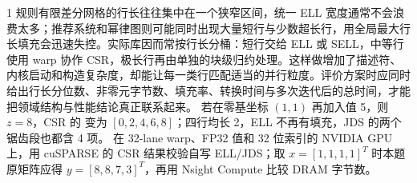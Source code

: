 \begin{solutionexercise}{1}
规则有限差分网格的行长往往集中在一个狭窄区间，统一 ELL 宽度通常不会浪费太多；推荐系统和幂律图则可能同时出现大量短行与少数超长行，用全局最大行长填充会迅速失控。实际库因而常按行长分桶：短行交给 ELL 或 SELL，中等行使用 warp 协作 CSR，极长行再由单独的块级归约处理。这样做增加了描述符、内核启动和构造复杂度，却能让每一类行匹配适当的并行粒度。评价方案时应同时给出行长分位数、非零元字节数、填充率、转换时间与多次迭代后的总时间，才能把领域结构与性能结论真正联系起来。
\variantheading 若在零基坐标 $(1,1)$ 再加入值 5，则 $z=8$，CSR 的  变为 $[0,2,4,6,8]$；四行均长 2，ELL 不再有填充，JDS 的两个锯齿段也都含 4 项。
\practiceheading 在 32-lane warp、FP32 值和 32 位索引的 NVIDIA GPU 上，用 cuSPARSE  的 CSR 结果校验自写 ELL/JDS；取 $x=[1,1,1,1]^T$ 时本题原矩阵应得 $y=[8,8,7,3]^T$，再用 Nsight Compute 比较 DRAM 字节数。
\end{solutionexercise}

